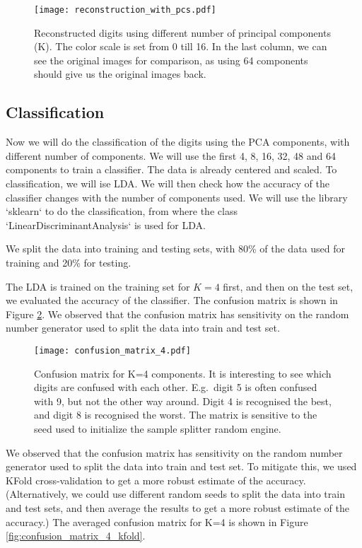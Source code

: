 \documentclass{article}
\begin{document}
\begin{figure}[h!]
    \centering
    \texttt{[image: reconstruction\_with\_pcs.pdf]}
    \caption{Reconstructed digits using different number of principal components (K).
        The color scale is set from 0 till 16.
        In the last column, we can see the original images for comparison,
        as using 64 components should give us the original images back.}
    \label{fig:reconstruction_with_pcs}
\end{figure}

\subsection{Classification}
Now we will do the classification of the digits using the PCA components,
with different number of components.
We will use the first 4, 8, 16, 32, 48 and 64 components to train a classifier.
The data is already centered and scaled. To classification, we will ise LDA.
We will then check how the accuracy of the classifier changes with the number of components used.
We will use the library `sklearn` to do the classification,
from where the class `LinearDiscriminantAnalysis` is used for LDA.

We split the data into training and testing sets,
with 80\% of the data used for training and 20\% for testing.

The LDA is trained on the training set for $K=4$ first, and then on the test set,
we evaluated the accuracy of the classifier.
The confusion matrix is shown in Figure \ref{fig:confusion_matrix_4}.
We observed that the confusion matrix has sensitivity on the random number generator
used to split the data into train and test set.

\begin{figure}[h!]
    \centering
    \texttt{[image: confusion\_matrix\_4.pdf]}
    \caption{Confusion matrix for K=4 components. It is interesting to see
        which digits are confused with each other. E.g.\ digit 5 is often confused with 9,
        but not the other way around.
        Digit 4 is recognised the best, and digit 8 is recognised the worst.
        The matrix is sensitive to the seed used to initialize the sample splitter random engine.}
    \label{fig:confusion_matrix_4}
\end{figure}

We observed that the confusion matrix has sensitivity on the random number generator
used to split the data into train and test set. To mitigate this,
we used KFold cross-validation to get a more robust estimate of the accuracy.
(Alternatively, we could use different random seeds to split the data into train and test sets,
and then average the results to get a more robust estimate of the accuracy.)
The averaged confusion matrix for K=4 is shown in Figure \ref{fig:confusion_matrix_4_kfold}.
\end{document}

